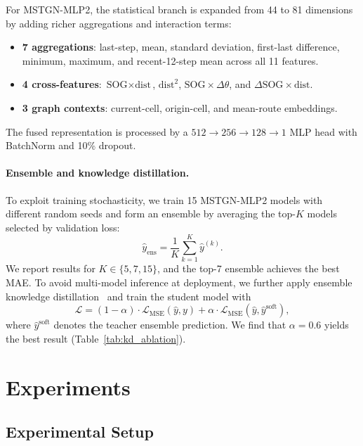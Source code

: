 \documentclass[conference]{IEEEtran}
\begin{document}
For MSTGN-MLP2, the statistical branch is expanded from 44 to 81 dimensions by adding richer aggregations and interaction terms:
\begin{itemize}
    \item \textbf{7 aggregations}: last-step, mean, standard deviation, first-last difference, minimum, maximum, and recent-12-step mean across all 11 features.
    \item \textbf{4 cross-features}: $\text{SOG} \times \text{dist}$, $\text{dist}^2$, $\text{SOG} \times \Delta\theta$, and $\Delta\text{SOG} \times \text{dist}$.
    \item \textbf{3 graph contexts}: current-cell, origin-cell, and mean-route embeddings.
\end{itemize}
The fused representation is processed by a $512 \to 256 \to 128 \to 1$ MLP head with BatchNorm and 10\% dropout.

\paragraph{Ensemble and knowledge distillation.}
To exploit training stochasticity, we train 15 MSTGN-MLP2 models with different random seeds and form an ensemble by averaging the top-$K$ models selected by validation loss:
\begin{equation}
    \hat{y}_{\text{ens}} = \frac{1}{K} \sum_{k=1}^{K} \hat{y}^{(k)}.
\end{equation}
We report results for $K \in \{5,7,15\}$, and the top-7 ensemble achieves the best MAE. To avoid multi-model inference at deployment, we further apply ensemble knowledge distillation~\cite{hinton2015distilling} and train the student model with
\begin{equation}
    \mathcal{L} = (1-\alpha)\cdot\mathcal{L}_{\text{MSE}}(\hat{y}, y) + \alpha\cdot\mathcal{L}_{\text{MSE}}(\hat{y}, \hat{y}^{\text{soft}}),
    \label{eq:kd_loss}
\end{equation}
where $\hat{y}^{\text{soft}}$ denotes the teacher ensemble prediction. We find that $\alpha = 0.6$ yields the best result (Table~\ref{tab:kd_ablation}).


\section{Experiments}

\subsection{Experimental Setup}
\end{document}
